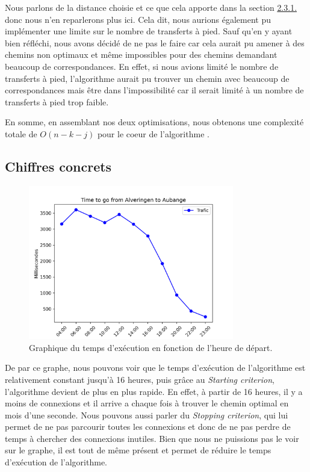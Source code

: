 \documentclass[12pt]{article}
\begin{document}
\begin{itemize}
    Nous parlons de la distance choisie et ce que cela apporte dans la section \hyperref[sec:walk]{2.3.1.} donc nous n'en reparlerons plus ici.
    Cela dit, nous aurions également pu implémenter une limite sur le nombre de transferts à pied. Sauf qu'en y ayant bien réfléchi, nous avons décidé de ne pas le faire car cela aurait
    pu amener à des chemins non optimaux et même impossibles pour des chemins demandant beaucoup de correspondances. En effet, si nous avions limité le nombre de transferts à pied,
    l'algorithme aurait pu trouver un chemin avec beaucoup de correspondances mais être dans l'impossibilité car il serait limité à un nombre de transferts à pied trop faible.
\end{itemize}

En somme, en assemblant nos deux optimisations, nous obtenons une complexité totale de $O(n - k - j)$ pour le coeur de l'algorithme \cite{dibbelt2017connection}.

\subsection{Chiffres concrets}
\begin{figure}[H]
  \centering
  \includegraphics[width=0.8\textwidth]{graphique_traffique}
  \caption{Graphique du temps d'exécution en fonction de l'heure de départ.}
  \label{fig:graphique_traffique}
\end{figure}
De par ce graphe, nous pouvons voir que le temps d'exécution de l'algorithme est relativement constant jusqu'à 16 heures, puis grâce au \emph{Starting criterion},
l'algorithme devient de plus en plus rapide. En effet, à partir de 16 heures, il y a moins de connexions et il arrive a chaque fois à trouver le chemin optimal en mois d'une seconde.
Nous pouvons aussi parler du \emph{Stopping criterion}, qui lui permet de ne pas parcourir toutes les connexions et donc de ne pas perdre de temps à chercher des connexions inutiles.
Bien que nous ne puissions pas le voir sur le graphe, il est tout de même présent et permet de réduire le temps d'exécution de l'algorithme.
\end{document}
